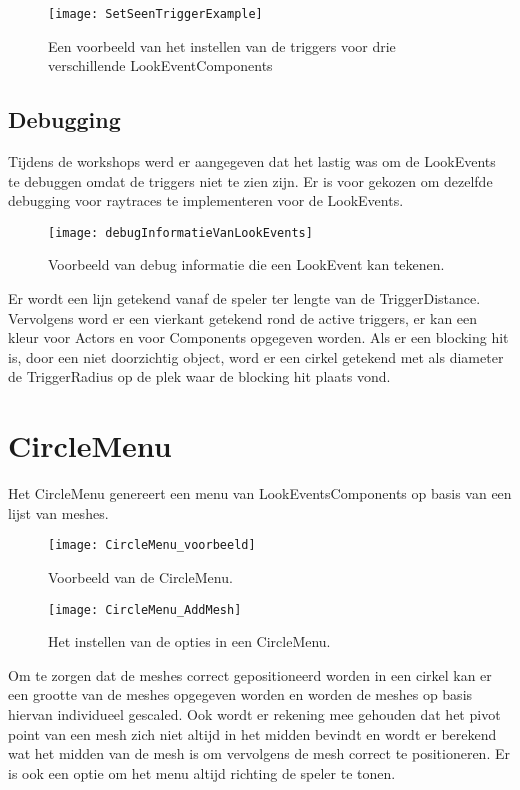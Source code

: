 \begin{figure}[!ht]
  \centering
    \texttt{[image: SetSeenTriggerExample]}
    \caption{Een voorbeeld van het instellen van de triggers voor drie verschillende LookEventComponents}
\end{figure}

\subsection{Debugging}
Tijdens de workshops werd er aangegeven dat het lastig was om de LookEvents te debuggen omdat de triggers niet te zien zijn. Er is voor gekozen om dezelfde debugging voor raytraces te implementeren voor de LookEvents.

\begin{figure}[!ht]
  \centering
    \texttt{[image: debugInformatieVanLookEvents]}
    \caption{Voorbeeld van debug informatie die een LookEvent kan tekenen.}
\end{figure}

Er wordt een lijn getekend vanaf de speler ter lengte van de TriggerDistance. Vervolgens word er een vierkant getekend rond de active triggers, er kan een kleur voor Actors en voor Components opgegeven worden. Als er een blocking hit is, door een niet doorzichtig object, word er een cirkel getekend met als diameter de TriggerRadius op de plek waar de blocking hit plaats vond.

\section{CircleMenu}
Het CircleMenu genereert een menu van LookEventsComponents op basis van een lijst van meshes.

\begin{figure}[!ht]
  \centering
    \texttt{[image: CircleMenu\_voorbeeld]}
    \caption{Voorbeeld van de CircleMenu.}
\end{figure}

\begin{figure}[!ht]
  \centering
    \texttt{[image: CircleMenu\_AddMesh]}
    \caption{Het instellen van de opties in een CircleMenu.}
\end{figure}

Om te zorgen dat de meshes correct gepositioneerd worden in een cirkel kan er een grootte van de meshes opgegeven worden en worden de meshes op basis hiervan individueel gescaled. Ook wordt er rekening mee gehouden dat het pivot point van een mesh zich niet altijd in het midden bevindt en wordt er berekend wat het midden van de mesh is om vervolgens de mesh correct te positioneren. Er is ook een optie om het menu altijd richting de speler te tonen. 

